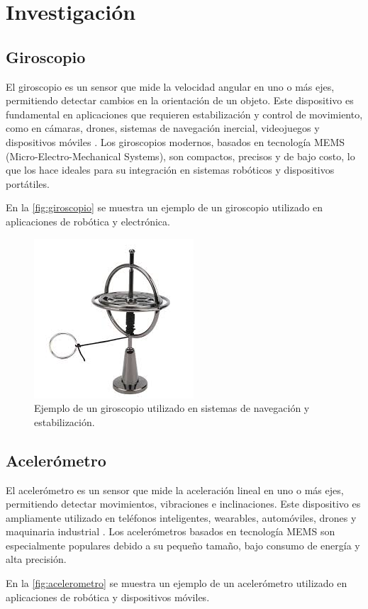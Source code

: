 \section{Investigación}

\subsection{Giroscopio}
El giroscopio es un sensor que mide la velocidad angular en uno o más ejes, permitiendo detectar cambios en la orientación de un objeto. Este dispositivo es fundamental en aplicaciones que requieren estabilización y control de movimiento, como en cámaras, drones, sistemas de navegación inercial, videojuegos y dispositivos móviles \cite{MEMS}. Los giroscopios modernos, basados en tecnología MEMS (Micro-Electro-Mechanical Systems), son compactos, precisos y de bajo costo, lo que los hace ideales para su integración en sistemas robóticos y dispositivos portátiles.

En la \autoref{fig:giroscopio} se muestra un ejemplo de un giroscopio utilizado en aplicaciones de robótica y electrónica.

\begin{figure}[h]
	\centering
	\includegraphics[width=0.3\linewidth]{img/Giroscopio}
	\caption{Ejemplo de un giroscopio utilizado en sistemas de navegación y estabilización.}
	\label{fig:giroscopio}
\end{figure}

\subsection{Acelerómetro}
El acelerómetro es un sensor que mide la aceleración lineal en uno o más ejes, permitiendo detectar movimientos, vibraciones e inclinaciones. Este dispositivo es ampliamente utilizado en teléfonos inteligentes, wearables, automóviles, drones y maquinaria industrial \cite{Acelerometro}. Los acelerómetros basados en tecnología MEMS son especialmente populares debido a su pequeño tamaño, bajo consumo de energía y alta precisión.

En la \autoref{fig:acelerometro} se muestra un ejemplo de un acelerómetro utilizado en aplicaciones de robótica y dispositivos móviles.


